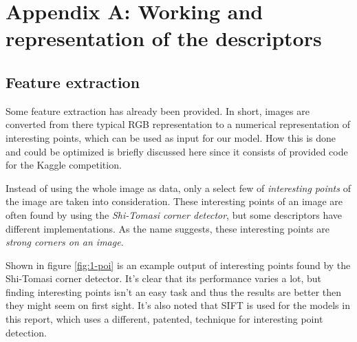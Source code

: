 \chapter*{Appendix A: Working and representation of the descriptors}

\section*{Feature extraction}

Some feature extraction has already been provided.
In short, images are converted from there typical RGB representation to a numerical representation of interesting points, which can be used as input for our model.
How this is done and could be optimized is briefly discussed here since it consists of provided code for the Kaggle competition.

Instead of using the whole image as data, only a select few of \textit{interesting points} of the image are taken into consideration.
These interesting points of an image are often found by using the \emph{Shi-Tomasi corner detector}, but some descriptors have different implementations.
As the name suggests, these interesting points are \textit{strong corners on an image}.

Shown in figure \ref{fig:1-poi} is an example output of interesting points found by the Shi-Tomasi corner detector.
It's clear that its performance varies a lot, but finding interesting points isn't an easy task and thus the results are better then they might seem on first sight.
It's also noted that SIFT is used for the models in this report, which uses a different, patented, technique for interesting point detection.

